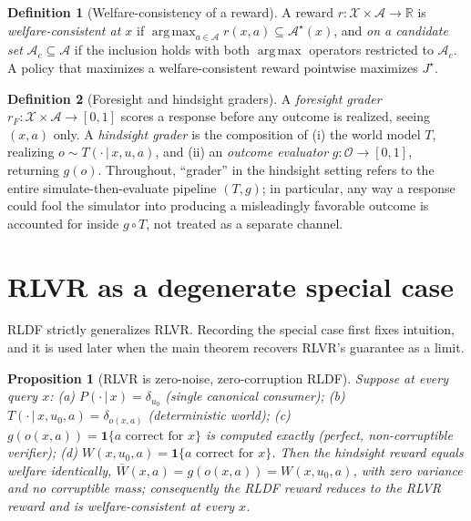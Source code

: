 \documentclass[11pt]{article}
\theoremstyle{plain}
\newtheorem{proposition}{Proposition}
\theoremstyle{definition}
\newtheorem{definition}{Definition}
\theoremstyle{remark}
\newcommand{\R}{\mathbb{R}}
\newcommand{\Ind}{\mathbf{1}}
\newcommand{\Xc}{\mathcal{X}}
\newcommand{\Ac}{\mathcal{A}}
\newcommand{\Oc}{\mathcal{O}}
\newcommand{\Wbar}{\overline{W}}
\newcommand{\given}{\,\vert\,}
\DeclareMathOperator*{\argmax}{arg\,max}
\begin{document}
\begin{definition}[Welfare-consistency of a reward]
\label{def:consistency}
A reward $r:\Xc\times\Ac\to\R$ is \emph{welfare-consistent at $x$} if
$\argmax_{a\in\Ac} r(x,a)\subseteq\Ac^\star(x)$, and \emph{on a candidate set}
$\Ac_c\subseteq\Ac$ if the inclusion holds with both $\argmax$ operators restricted to
$\Ac_c$. A policy that maximizes a welfare-consistent reward pointwise maximizes $J^\star$.
\end{definition}

\begin{definition}[Foresight and hindsight graders]
\label{def:graders}
A \emph{foresight grader} $r_F:\Xc\times\Ac\to[0,1]$ scores a response before any outcome is
realized, seeing $(x,a)$ only. A \emph{hindsight grader} is the composition of (i) the world
model $T$, realizing $o\sim T(\cdot\given x,u,a)$, and (ii) an \emph{outcome evaluator}
$g:\Oc\to[0,1]$, returning $g(o)$. Throughout, ``grader'' in the hindsight setting refers to the
entire simulate-then-evaluate pipeline $(T,g)$; in particular, any way a response could fool the
simulator into producing a misleadingly favorable outcome is accounted for inside $g\circ T$,
not treated as a separate channel.
\end{definition}


\section{RLVR as a degenerate special case}
\label{sec:rlvr}

RLDF strictly generalizes RLVR. Recording the special case first fixes intuition, and it is used
later when the main theorem recovers RLVR's guarantee as a limit.

\begin{proposition}[RLVR is zero-noise, zero-corruption RLDF]
\label{prop:rlvr}
Suppose at every query $x$: \textup{(a)} $P(\cdot\given x)=\delta_{u_0}$ (single canonical
consumer); \textup{(b)} $T(\cdot\given x,u_0,a)=\delta_{o(x,a)}$ (deterministic world);
\textup{(c)} $g(o(x,a))=\Ind\{a\text{ correct for }x\}$ is computed exactly (perfect,
non-corruptible verifier); \textup{(d)} $W(x,u_0,a)=\Ind\{a\text{ correct for }x\}$. Then the
hindsight reward equals welfare identically, $\Wbar(x,a)=g(o(x,a))=W(x,u_0,a)$, with zero
variance and no corruptible mass; consequently the RLDF reward reduces to the RLVR reward and
is welfare-consistent at every $x$.
\end{proposition}
\end{document}
